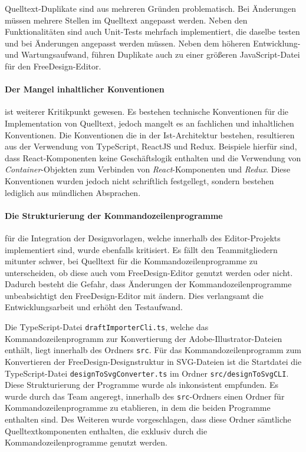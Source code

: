 Quelltext-Duplikate sind aus mehreren Gründen problematisch. Bei Änderungen müssen mehrere Stellen im Quelltext angepasst werden. Neben den Funktionalitäten sind auch Unit-Tests mehrfach implementiert, die daselbe testen und bei Änderungen angepasst werden müssen. Neben dem höheren Entwicklung- und Wartungsaufwand, führen Duplikate auch zu einer größeren JavaScript-Datei für den FreeDesign-Editor. 

\paragraph{Der Mangel inhaltlicher Konventionen} ist weiterer Kritikpunkt gewesen. Es bestehen technische Konventionen für die Implementation von Quelltext, jedoch mangelt es an fachlichen und inhaltlichen Konventionen. Die Konventionen die in der Ist-Architektur bestehen, resultieren aus der Verwendung von TypeScript, ReactJS und Redux. Beispiele hierfür sind, dass React-Komponenten keine Geschäftslogik enthalten und die Verwendung von \emph{Container}-Objekten zum Verbinden von \emph{React}-Komponenten und \emph{Redux}.
Diese Konventionen wurden jedoch nicht schriftlich festgellegt, sondern bestehen lediglich aus mündlichen Absprachen. 

\paragraph{Die Strukturierung der Kommandozeilenprogramme} für die Integration der Designvorlagen, welche innerhalb des Editor-Projekts implementiert sind, wurde ebenfalls kritisiert.
Es fällt den Teammitgliedern mitunter schwer, bei Quelltext für die Kommandozeilenprogramme zu unterscheiden, ob diese auch vom FreeDesign-Editor genutzt werden oder nicht. Dadurch besteht die Gefahr, dass Änderungen der Kommandozeilenprogramme unbeabsichtigt den FreeDesign-Editor mit ändern. Dies verlangsamt die Entwicklungsarbeit und erhöht den Testaufwand.

Die TypeScript-Datei \lstinline|draftImporterCli.ts|, welche das Kommandozeilenprogramm zur Konvertierung der Adobe-Illustrator-Dateien enthält, liegt innerhalb des Ordners \lstinline|src|. Für das Kommandozeilenprogramm zum Konvertieren der FreeDesign-Designstruktur in SVG-Dateien ist die Startdatei die TypeScript-Datei \lstinline|designToSvgConverter.ts| im Ordner \lstinline|src/designToSvgCLI|. Diese Strukturierung der Programme wurde als inkonsistent empfunden. 
Es wurde durch das Team angeregt, innerhalb des \lstinline|src|-Ordners einen Ordner für Kommandozeilenprogramme zu etablieren, in dem die beiden Programme enthalten sind. Des Weiteren wurde vorgeschlagen, dass diese Ordner sämtliche Quelltextkomponenten enthalten, die exklusiv durch die Kommandozeilenprogramme genutzt werden.  

